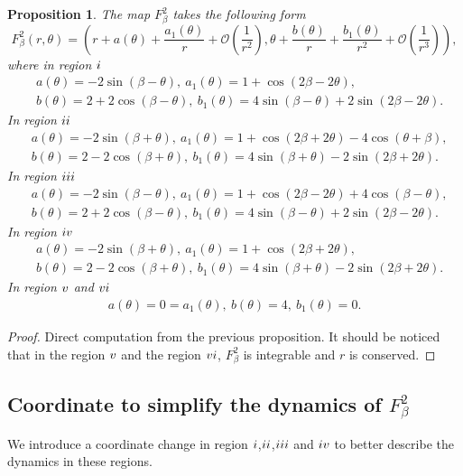 \documentclass{article}
\def \Rone{\uppercase\expandafter{\romannumeral1}}
\def \Rtwo{\uppercase\expandafter{\romannumeral2}}
\def \Rthree{\uppercase\expandafter{\romannumeral3}}
\def \Rfour{\uppercase\expandafter{\romannumeral4}}
\def \Rfive{\uppercase\expandafter{\romannumeral5}}
\def \Rsix{\uppercase\expandafter{\romannumeral6}}
\numberwithin{figure}{section}
\numberwithin{equation}{section}
\newtheorem{proposition}[lemma]{Proposition}
\theoremstyle{remark}
\theoremstyle{definition}
\begin{document}
\begin{proposition}\label{mappolar}
	The map $F_\beta^2$ takes the following form
	$$F_\beta^2\left(r,\theta\right)=\left(r+a\left(\theta\right)+\frac{a_1\left(\theta\right)}{r}+\mathcal{O}\left(\frac{1}{r^2}\right),\theta+\frac{b\left(\theta\right)}{r}+\frac{b_1\left(\theta\right)}{r^2}+\mathcal{O}\left(\frac{1}{r^3}\right)\right),$$
	where in region $\Rone$
	\begin{align*}
		&a(\theta)=-2\sin(\beta-\theta),\ a_1(\theta)=1+\cos(2\beta-2\theta),\\
		&b(\theta)=2+2\cos(\beta-\theta),\ b_1(\theta)=4\sin(\beta-\theta)+2\sin(2\beta-2\theta).
	\end{align*}
	In region $\Rtwo$
	\begin{align*}
		&a(\theta)=-2\sin(\beta+\theta),\ a_1(\theta)=1+\cos(2\beta+2\theta)-4\cos(\theta+\beta),\\
		&b(\theta)=2-2\cos(\beta+\theta),\ b_1(\theta)=4\sin(\beta+\theta)-2\sin(2\beta+2\theta).
	\end{align*}
	In region $\Rthree$
	\begin{align*}
		&a(\theta)=-2\sin(\beta-\theta),\ a_1(\theta)=1+\cos(2\beta-2\theta)+4\cos(\beta-\theta),\\
		&b(\theta)=2+2\cos(\beta-\theta),\ b_1(\theta)=4\sin(\beta-\theta)+2\sin(2\beta-2\theta).
	\end{align*}
	In region $\Rfour$
	\begin{align*}
		&a(\theta)=-2\sin(\beta+\theta),\ a_1(\theta)=1+\cos(2\beta+2\theta),\\
		&b(\theta)=2-2\cos(\beta+\theta),\ b_1(\theta)=4\sin(\beta+\theta)-2\sin(2\beta+2\theta).
	\end{align*}
	In region $\Rfive$ and $\Rsix$
	\begin{align*}
		a(\theta)=0=a_1(\theta),\ b(\theta)=4,\ b_1(\theta)=0.
	\end{align*}
\end{proposition}

\begin{proof}
	Direct computation from the previous proposition. It should be noticed that in the region $\Rfive$ and the region $\Rsix$, $F_\beta^2$ is integrable and $r$ is conserved.
\end{proof}

\subsection{Coordinate to simplify the dynamics of \texorpdfstring{$F_\beta^2$}{TEXT}}
We introduce a coordinate change in region $\Rone$,$\Rtwo$,$\Rthree$ and $\Rfour$ to better describe the dynamics in these regions. 
\end{document}
